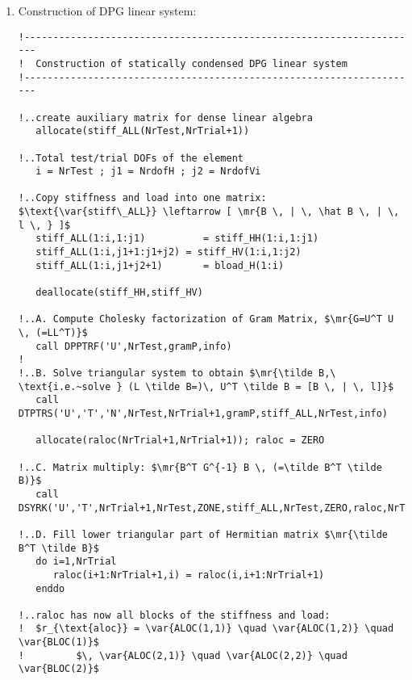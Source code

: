 \begin{enumerate}
{\begin{lstlisting}[mathescape,caption=\file{POISSON/PRIMAL\_DPG/}\routine{elem}: boundary integration.]
!     ...loop through enriched H1 test functions
         do k1=1,nrdofHH
            v = shapHH(k1)

!        ...loop through H(div) trial functions
            do k2=1,nrdofVi
!           ...Piola transformation
               s(1:3) = (dxdxi(1:3,1)*shapV(1,k2) + &
                          dxdxi(1:3,2)*shapV(2,k2) + &
                          dxdxi(1:3,3)*shapV(3,k2)) / rjac
!           ...normal component
               sn = s(1)*rn(1)+s(2)*rn(2)+s(3)*rn(3)
!
!           ...accumulate stiffness: $-\lb \sigma \cdot n, v \rb_{\Gamma_h}$
               stiff_HV(k1,k2) = stiff_HV(k1,k2) - sn*v*weight

            enddo; enddo ! end loop through trial / test functions
   enddo; enddo; ! end loop through integration points / faces
\end{lstlisting}
	}
	\item{ Construction of DPG linear system:
\begin{lstlisting}[mathescape,caption=\file{POISSON/PRIMAL\_DPG/}\routine{elem}: constructing DPG linear system.]
!---------------------------------------------------------------------
!  Construction of statically condensed DPG linear system
!---------------------------------------------------------------------

!..create auxiliary matrix for dense linear algebra
   allocate(stiff_ALL(NrTest,NrTrial+1))

!..Total test/trial DOFs of the element
   i = NrTest ; j1 = NrdofH ; j2 = NrdofVi

!..Copy stiffness and load into one matrix: $\text{\var{stiff\_ALL}} \leftarrow [ \mr{B \, | \, \hat B \, | \, l \, } ]$
   stiff_ALL(1:i,1:j1)          = stiff_HH(1:i,1:j1)
   stiff_ALL(1:i,j1+1:j1+j2) = stiff_HV(1:i,1:j2)
   stiff_ALL(1:i,j1+j2+1)       = bload_H(1:i)

   deallocate(stiff_HH,stiff_HV)

!..A. Compute Cholesky factorization of Gram Matrix, $\mr{G=U^T U \, (=LL^T)}$
   call DPPTRF('U',NrTest,gramP,info)
!
!..B. Solve triangular system to obtain $\mr{\tilde B,\ \text{i.e.~solve } (L \tilde B=)\, U^T \tilde B = [B \, | \, l]}$
   call DTPTRS('U','T','N',NrTest,NrTrial+1,gramP,stiff_ALL,NrTest,info)

   allocate(raloc(NrTrial+1,NrTrial+1)); raloc = ZERO

!..C. Matrix multiply: $\mr{B^T G^{-1} B \, (=\tilde B^T \tilde B)}$
   call DSYRK('U','T',NrTrial+1,NrTest,ZONE,stiff_ALL,NrTest,ZERO,raloc,NrTrial+1)

!..D. Fill lower triangular part of Hermitian matrix $\mr{\tilde B^T \tilde B}$
   do i=1,NrTrial
      raloc(i+1:NrTrial+1,i) = raloc(i,i+1:NrTrial+1)
   enddo

!..raloc has now all blocks of the stiffness and load:
!  $r_{\text{aloc}} = \var{ALOC(1,1)} \quad \var{ALOC(1,2)} \quad \var{BLOC(1)}$
!         $\, \var{ALOC(2,1)} \quad \var{ALOC(2,2)} \quad \var{BLOC(2)}$
\end{lstlisting}
	}
\end{enumerate}



